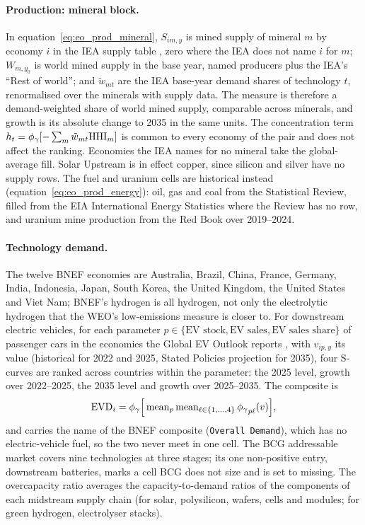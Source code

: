 \paragraph{Production: mineral block.} In equation~\eqref{eq:eo_prod_mineral}, $S_{im,y}$ is
mined supply of mineral $m$ by economy $i$ in the IEA supply table \citep{iea2026cmdata}, zero where
the IEA does not name $i$ for $m$; $W_{m,y_0}$ is world mined supply in the base year, named
producers plus the IEA's ``Rest of world''; and $\tilde w_{mt}$ are the IEA base-year demand shares
of technology $t$, renormalised over the minerals with supply data. The measure is therefore a
demand-weighted share of world mined supply, comparable across minerals, and growth is its
absolute change to 2035 in the same units. The concentration term
$h_t=\phi_{\gamma}[-\sum_m\tilde w_{mt}\mathrm{HHI}_m]$ is common to every economy of the pair and does not
affect the ranking. Economies the IEA names for no mineral take the global-average fill. Solar
Upstream is in effect copper, since silicon and silver have no supply rows. The fuel and uranium
cells are historical instead (equation~\eqref{eq:eo_prod_energy}): oil, gas and coal from the
Statistical Review, filled from the EIA International Energy Statistics where the Review has no
row, and uranium mine production from the Red Book over 2019--2024.

\paragraph{Technology demand.} The twelve BNEF economies are Australia, Brazil, China, France,
Germany, India, Indonesia, Japan, South Korea, the United Kingdom, the United States and Viet Nam;
BNEF's hydrogen is all hydrogen, not only the electrolytic hydrogen that the WEO's low-emissions
measure is closer to. For downstream electric vehicles, for each parameter
$p\in\{\text{EV stock},\text{EV sales},\text{EV sales share}\}$ of passenger cars in the economies
the Global EV Outlook reports \citep{iea2026gevo}, with $v_{ip,y}$ its value (historical for 2022
and 2025, Stated Policies projection for 2035), four S-curves are ranked across countries within
the parameter: the 2025 level, growth over 2022--2025, the 2035 level and growth over 2025--2035.
The composite is
\begin{equation}\label{eq:eo_ev}
  \mathrm{EVD}_{i}=\phi_{\gamma}\Big[\operatorname{mean}_{p}\operatorname{mean}_{\ell\in\{1,\dots,4\}}{\phi_{\gamma}}_{p\ell}(v)\Big],
\end{equation}
and carries the name of the BNEF composite (\texttt{Overall Demand}), which has no
electric-vehicle fuel, so the two never meet in one cell. The BCG addressable market covers nine
technologies at three stages; its one non-positive entry, downstream batteries, marks a cell BCG
does not size and is set to missing. The overcapacity ratio averages the capacity-to-demand ratios
of the components of each midstream supply chain (for solar, polysilicon, wafers, cells and
modules; for green hydrogen, electrolyser stacks).

